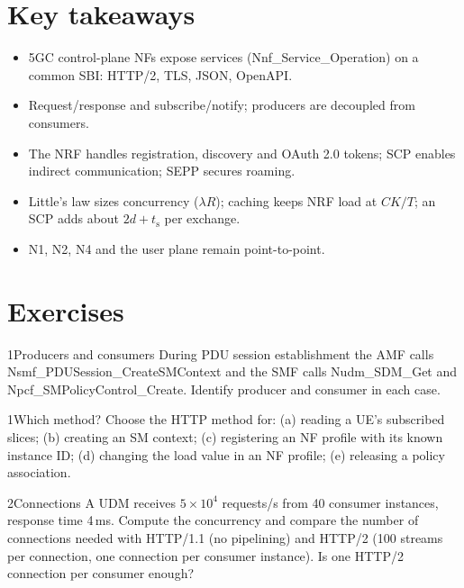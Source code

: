 \documentclass[11pt,a4paper]{article}
\begin{document}
\section{Key takeaways}
\begin{takeawaybox}
\begin{itemize}
  \item 5GC control-plane NFs expose services (Nnf\_Service\_Operation) on a common SBI: HTTP/2, TLS, JSON, OpenAPI.
  \item Request/response and subscribe/notify; producers are decoupled from consumers.
  \item The NRF handles registration, discovery and OAuth 2.0 tokens; SCP enables indirect communication; SEPP secures roaming.
  \item Little's law sizes concurrency ($\lambda R$); caching keeps NRF load at $CK/T$; an SCP adds about $2d + t_{\mathrm{s}}$ per exchange.
  \item N1, N2, N4 and the user plane remain point-to-point.
\end{itemize}
\end{takeawaybox}

\section{Exercises}

\begin{exercisebox}{1}{Producers and consumers}\label{exr:pc}
During PDU session establishment the AMF calls Nsmf\_PDUSession\_CreateSMContext and the SMF calls Nudm\_SDM\_Get and
Npcf\_SMPolicyControl\_Create. Identify producer and consumer in each case.
\end{exercisebox}

\begin{exercisebox}{1}{Which method?}\label{exr:method}
Choose the HTTP method for: (a) reading a UE's subscribed slices; (b) creating an SM context; (c) registering an NF profile with
its known instance ID; (d) changing the load value in an NF profile; (e) releasing a policy association.
\end{exercisebox}

\begin{exercisebox}{2}{Connections}\label{exr:conn}
A UDM receives $5\times10^4$ requests/s from 40 consumer instances, response time 4\,ms. Compute the concurrency and compare the
number of connections needed with HTTP/1.1 (no pipelining) and HTTP/2 (100 streams per connection, one connection per consumer
instance). Is one HTTP/2 connection per consumer enough?
\end{exercisebox}
\end{document}
